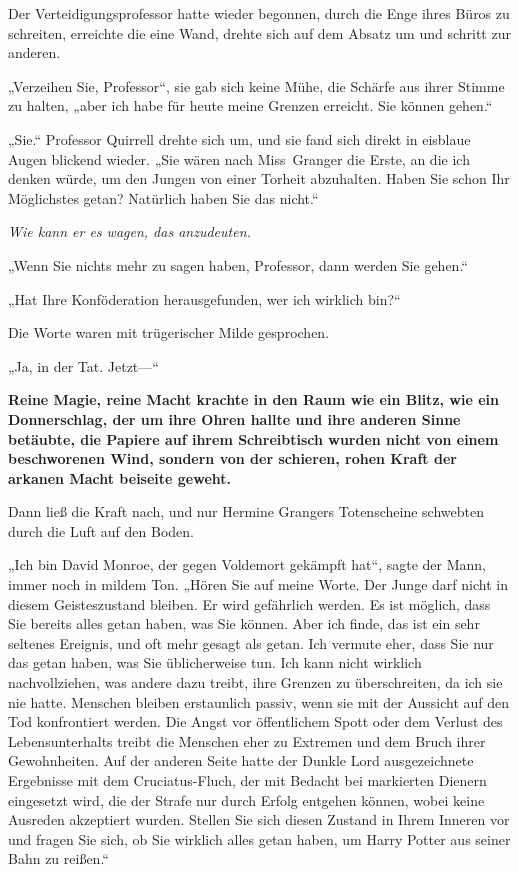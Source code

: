 {Der Verteidigungsprofessor hatte wieder begonnen, durch die Enge ihres Büros zu schreiten, erreichte die eine Wand, drehte sich auf dem Absatz um und schritt zur anderen.

„Verzeihen Sie, Professor“, sie gab sich keine Mühe, die Schärfe aus ihrer Stimme zu halten, „aber ich habe für heute meine Grenzen erreicht. Sie können gehen.“

„Sie.“ Professor Quirrell drehte sich um, und sie fand sich direkt in eisblaue Augen blickend wieder. „Sie wären nach Miss~Granger die Erste, an die ich denken würde, um den Jungen von einer Torheit abzuhalten. Haben Sie schon Ihr Möglichstes getan? Natürlich haben Sie das nicht.“

\emph{Wie kann er es wagen, das anzudeuten.}

„Wenn Sie nichts mehr zu sagen haben, Professor, dann werden Sie gehen.“

„Hat Ihre Konföderation herausgefunden, wer ich wirklich bin?“

Die Worte waren mit trügerischer Milde gesprochen.

„Ja, in der Tat. Jetzt—“

\textbf{Reine Magie, reine Macht krachte in den Raum wie ein Blitz, wie ein Donnerschlag, der um ihre Ohren hallte und ihre anderen Sinne betäubte, die Papiere auf ihrem Schreibtisch wurden nicht von einem beschworenen Wind, sondern von der schieren, rohen Kraft der arkanen Macht beiseite geweht.}

Dann ließ die Kraft nach, und nur Hermine Grangers Totenscheine schwebten durch die Luft auf den Boden.

„Ich bin David Monroe, der gegen Voldemort gekämpft hat“, sagte der Mann, immer noch in mildem Ton. „Hören Sie auf meine Worte. Der Junge darf nicht in diesem Geisteszustand bleiben. Er wird gefährlich werden. Es ist möglich, dass Sie bereits alles getan haben, was Sie können. Aber ich finde, das ist ein sehr seltenes Ereignis, und oft mehr gesagt als getan. Ich vermute eher, dass Sie nur das getan haben, was Sie üblicherweise tun. Ich kann nicht wirklich nachvollziehen, was andere dazu treibt, ihre Grenzen zu überschreiten, da ich sie nie hatte. Menschen bleiben erstaunlich passiv, wenn sie mit der Aussicht auf den Tod konfrontiert werden. Die Angst vor öffentlichem Spott oder dem Verlust des Lebensunterhalts treibt die Menschen eher zu Extremen und dem Bruch ihrer Gewohnheiten. Auf der anderen Seite hatte der Dunkle Lord ausgezeichnete Ergebnisse mit dem Cruciatus-Fluch, der mit Bedacht bei markierten Dienern eingesetzt wird, die der Strafe nur durch Erfolg entgehen können, wobei keine Ausreden akzeptiert wurden. Stellen Sie sich diesen Zustand in Ihrem Inneren vor und fragen Sie sich, ob Sie wirklich alles getan haben, um Harry Potter aus seiner Bahn zu reißen.“

}
